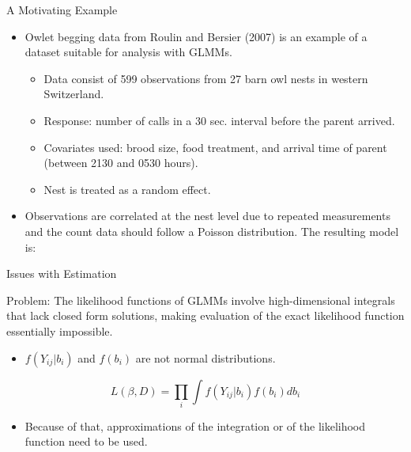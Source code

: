 \documentclass{beamer}\usepackage[]{graphicx}\usepackage[]{color}
\begin{document}
\begin{frame}{A Motivating Example}
  \begin{itemize}
        \item Owlet begging data from Roulin and Bersier (2007) is an example of a dataset suitable for analysis with GLMMs.
        \begin{itemize}
          \item Data consist of 599 observations from 27 barn owl nests in western Switzerland.
          \item Response: number of calls in a 30 sec. interval before the parent arrived. 
          \item Covariates used: brood size, food treatment, and arrival time of parent (between 2130 and 0530 hours).
          \item Nest is treated as a random effect. 
        \end{itemize}
        \item Observations are correlated at the nest level due to repeated measurements and the count data should follow a Poisson distribution. The resulting model is:
  \end{itemize}
  
\end{frame}

\begin{frame}{Issues with Estimation}
	 \begin{block}{Problem:}
      The likelihood functions of GLMMs involve high-dimensional integrals that lack closed form solutions, making evaluation of the exact likelihood function essentially impossible. 
   \end{block}
   
   \begin{itemize}
		\item $f(Y_{ij}|b_i)$ and $f(b_i)$ are not normal distributions.
	\end{itemize}
   
   $$ L(\beta, D) = \prod_i \int f(Y_{ij}|b_i)f(b_i) db_i $$
	
	\begin{itemize}
		\item Because of that, approximations of the integration or of the likelihood function need to be used. 
	\end{itemize}
\end{frame}
\end{document}
